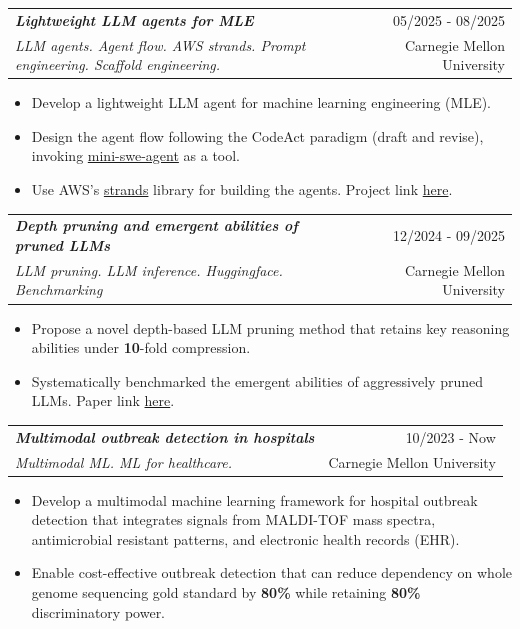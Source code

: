 \documentclass[letterpaper,11pt]{article}
\makeatletter
\newcommand{\resumeItem}[1]{
  \item\small{
    {#1 \vspace{-1pt}}
  }
}
\newcommand{\resumeSubheading}[4]{
  \vspace{-1pt}\item
    \begin{tabular*}{\textwidth}[t]{l@{\extracolsep{\fill}}r}
      \textbf{\textit{#1}} & {\color{dark-grey}\small #2}\vspace{1pt}\\ %
      \textit{#3} & {\color{dark-grey} \small #4}\\ %
    \end{tabular*}\vspace{-4pt}
}
\newcommand{\resumeSubHeadingListStart}{\begin{itemize}[leftmargin=0in, label={}]}
\newcommand{\resumeSubHeadingListEnd}{\end{itemize}}
\newcommand{\resumeItemListStart}{\begin{itemize}}
\newcommand{\resumeItemListEnd}{\end{itemize}\vspace{0pt}}
\makeatother
\begin{document}
    \resumeSubheading
    {Lightweight LLM agents for MLE}{05/2025 - 08/2025}
    {LLM agents. Agent flow. AWS strands. Prompt engineering. Scaffold engineering.}{Carnegie Mellon University}%
    \resumeItemListStart
        \resumeItem {Develop a lightweight LLM agent for machine learning engineering (MLE).}
      \resumeItem {Design the agent flow following the CodeAct paradigm (draft and revise), invoking \href{https://github.com/swe-agent/mini-swe-agent}{mini-swe-agent} as a tool.}
      \resumeItem {Use AWS's \href{https://strandsagents.com/}{strands} library for building the agents. Project link \href{https://github.com/ChangLiu-DrPatient/miniMLEagent}{here}. }
    \resumeItemListEnd
    
    \resumeSubheading
    {Depth pruning and emergent abilities of pruned LLMs}{12/2024 - 09/2025}
    {LLM pruning. LLM inference. Huggingface. Benchmarking}{Carnegie Mellon University}%
    \resumeItemListStart
      \resumeItem {Propose a novel depth-based LLM pruning method that retains key reasoning abilities under \textbf{10}-fold compression.}
      \resumeItem{Systematically benchmarked the emergent abilities of aggressively pruned LLMs. Paper link \href{https://openreview.net/forum?id=aP3sv2xrGH}{here}.}
    \resumeItemListEnd


    \resumeSubheading
    {Multimodal outbreak detection in hospitals}{10/2023 - Now}
    {Multimodal ML. ML for healthcare. }{Carnegie Mellon University}%
    \resumeItemListStart
      \resumeItem {Develop a multimodal machine learning framework for hospital outbreak detection that integrates signals from MALDI-TOF mass spectra, antimicrobial resistant patterns, and electronic health records (EHR).}
      \resumeItem {Enable cost-effective outbreak detection that can reduce dependency on whole genome sequencing gold standard by \textbf{80\%} while retaining \textbf{80\%} discriminatory power.}
    \resumeItemListEnd
\end{document}
